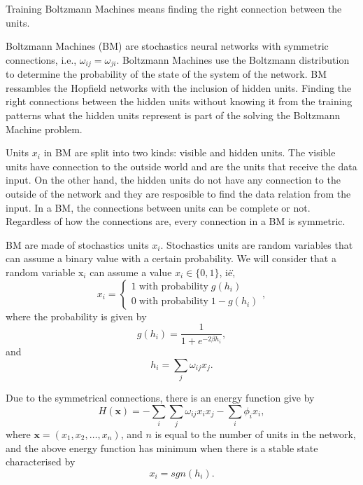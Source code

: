 Training Boltzmann Machines means finding the right connection between the units.

Boltzmann Machines (BM) are stochastics neural networks with symmetric connections, i.e., $\omega_{ij} = \omega_{ji}$.
Boltzmann Machines use the Boltzmann distribution to determine the probability of the state of the system of the network.
BM ressambles the Hopfield networks with the inclusion of hidden units.
Finding the right connections between the hidden units without knowing it from the training patterns what the hidden units represent is part of the solving the Boltzmann Machine problem.

Units $x_{i}$ in BM are split into two kinds: visible and hidden units.
The visible units have connection to the outside world and are the units that receive the data input.
On the other hand, the hidden units do not have any connection to the outside of the network and they are resposible to find the data relation from the input.
In a BM, the connections between units can be complete or not.
Regardless of how the connections are, every connection in a BM is symmetric.

BM are made of stochastics units $x_{i}$.
Stochastics units are random variables that can assume a binary value with a certain probability. 
We will consider that a random variable $\mathrm{x}_{i}$ can assume a value $x_{i} \in \{0, 1\}$, i\. e\.,
\begin{equation}
  x_{i} =
    \begin{cases}
      1 \; \text{with probability} \; g(h_{i}) \\
      0 \; \text{with probability} \; 1 - g(h_{i})
    \end{cases},
  \label{eq:stochastic-unit-values}
\end{equation}
where the probability is given by
\begin{equation}
  g(h_{i}) = \frac{1}{1 + e^{-2 \beta h_{i}}},
  \label{eq:stochastic-unit-prob}
\end{equation}
and
\begin{equation}
  h_{i} = \sum_{j}\omega_{ij}x_{j}.
  \label{eq:stochastic-unit-input}
\end{equation}

Due to the symmetrical connections, there is an energy function give by
\begin{equation}
  H(\mathbf{x}) = - \sum_{i} \sum_{j} \omega_{ij}x_{i}x_{j} - \sum_{i} \phi_{i}x_{i},
  \label{eq:eq4}
\end{equation}
where $\mathbf{x} = (x_{1}, x_{2}, \dots, x_{n})$, and $n$ is equal to the number of units in the network, and the above energy function has minimum when there is a stable state characterised by
\begin{equation}
  x_{i} = sgn(h_{i}).
  \label{eq:eq5}
\end{equation}

